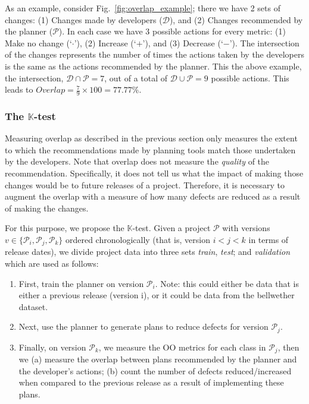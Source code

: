 \documentclass[smallextended]{svjour3}       %
\newcommand{\be}{\begin{enumerate}}
\newcommand{\ee}{\end{enumerate}}
\newcommand{\ktest}{$\mathbb{K}$-test}
\newcommand{\fig}[1]{Fig.~\ref{fig:#1}}
\begin{document}
As an example, consider \fig{overlap_example}; there we have 2 sets of changes: (1) Changes made by developers ($\mathcal{D}$), and (2) Changes recommended by the planner ($\mathcal{P}$). In each case we have 3 possible actions for every metric: (1) Make no change (`$\cdot$'), (2) Increase (`$+$'), and (3) Decrease (`$-$'). The intersection of the changes represents the number of times the actions taken by the developers is the same as the actions recommended by the planner. This the above example, the intersection, $\mathcal{D}\cap\mathcal{P}=7$, out of a total of $\mathcal{D}\cup\mathcal{P}=9$ possible actions. This leads to $Overlap=\frac{7}{9}\times100=77.77\%$.





\subsubsection{The \ktest}

Measuring overlap as described in the previous section only measures the extent to which the recommendations made by planning tools match those undertaken by the developers. 
Note that overlap does not measure the \textit{quality} of the recommendation. Specifically, it does not tell us what the impact of making those changes would be to future releases of a project. Therefore, it is necessary to augment the overlap with a measure of how many defects are reduced as a result of making the changes. 


For this purpose, we propose the \ktest. Given a project $\mathcal{P}$ with versions $v\in\{\mathcal{P}_i, \mathcal{P}_j, \mathcal{P}_k\}$ ordered chronologically (that is, version $i<j<k$ in terms of release dates), we divide  project data into three sets \textit{train}, \textit{test}; and \textit{validation}
which are used as follows:
\be
\item First, train the planner on version $\mathcal{P}_i$. Note: this could either be data that is either a previous release (version i), or it could be data from the bellwether dataset. 
\item Next, use the planner to generate plans to reduce defects for version $\mathcal{P}_j$.
\item Finally, on version $\mathcal{P}_k$, we measure the OO metrics for each class in $\mathcal{P}_j$, then we (a) measure the overlap between plans recommended by the planner and the developer's actions; (b) count the number of defects reduced/increased when compared to the previous release as a result of implementing these plans.
\ee
\end{document}
